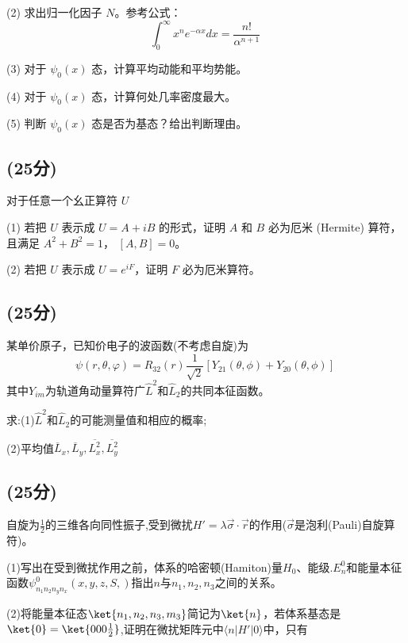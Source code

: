 (2) 求出归一化因子 $N$。参考公式：
\[\int_0^\infty x^n e^{- \alpha x} dx = \frac{n!}{\alpha^{n+1}}~\]

(3) 对于 $\psi_0(x)$ 态，计算平均动能和平均势能。

(4) 对于 $\psi_0(x)$ 态，计算何处几率密度最大。

(5) 判断 $\psi_0(x)$ 态是否为基态？给出判断理由。
\subsection{(25分)}
对于任意一个幺正算符 \( U \)

(1) 若把 \( U \) 表示成 \( U = A + iB \) 的形式，证明 \( A \) 和 \( B \) 必为厄米 (Hermite) 算符，且满足 \( A^2 + B^2 = 1 \)， \([A, B] = 0 \)。

(2) 若把 \( U \) 表示成 \( U = e^{iF} \)，证明 \( F \) 必为厄米算符。
\subsection{(25分)}
某单价原子，已知价电子的波函数(不考虑自旋)为
$$\psi(r,\theta,\varphi)=R_{32}(r)\frac{1}{\sqrt{2}}[Y_{21}(\theta,\phi)+Y_{20}(\theta,\phi)]~$$
其中$Y_{im}$为轨道角动量算符广$\hat{L}^2$和$\hat{L}_2$的共同本征函数。

求:(1)$\hat{L}^2$和$\hat{L}_2$的可能测量值和相应的概率;

(2)平均值$\overline{L}_x,\overline{L}_y,\overline{L^2_x},\overline{L^2_y}$
\subsection{(25分)}
自旋为$\frac{1}{2}$的三维各向同性振子,受到微扰$H'=\lambda \vec{\sigma}\cdot \vec{r}$的作用($\vec{\sigma}$是泡利(Pauli)自旋算符)。

(1)写出在受到微扰作用之前，体系的哈密顿(Hamiton)量$H_0$、能级.$E^0_n$和能量本征函数$\psi^0_{n_1n_2n_yn_x}(x,y,z,S,)$指出$n$与$n_1,n_2,n_3$之间的关系。

(2)将能量本征态$\ket{n_1,n_2,n_3,m_3}$简记为$\ket{n}$，若体系基态是$\ket{0}=\ket{000\frac{1}{2}}$,证明在微扰矩阵元中$\langle n | H' | 0 \rangle$中，只有
